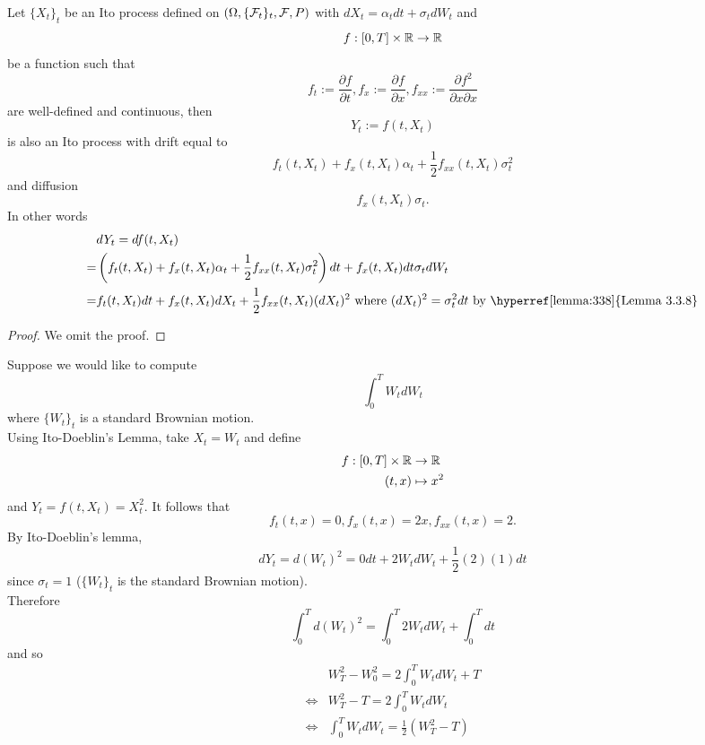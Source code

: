 \documentclass[11pt,fleqn]{book} %
\begin{document}
\begin{theorem} \label{thm:339}
Let \(\{X_t\}_t\) be an Ito process defined on \((\Omega, \{\mathcal{F}_t\}_t, \mathcal{F}, P)\) with \(dX_t = \alpha_tdt + \sigma_tdW_t\) and
\[
f:[0, T]\times\mathbb{R}\rightarrow\mathbb{R}
\]
be a function such that
\[
f_t := \frac{\partial f}{\partial t}, f_x := \frac{\partial f}{\partial x}, f_{xx} := \frac{\partial f^2}{\partial x\partial x}
\]
are well-defined and continuous, then
\[
Y_t := f(t, X_t)
\]
is also an Ito process with drift equal to
\[
f_t(t, X_t) + f_x(t, X_t)\alpha_t + \frac12 f_{xx}(t, X_t)\sigma_t^2
\]
and diffusion
\[
f_x(t, X_t)\sigma_t.
\]
\indent In other words
\[
\begin{aligned}
&dY_t = df(t, X_t) \\
= &\left(f_t(t, X_t) + f_x(t, X_t)\alpha_t + \frac12 f_{xx}(t, X_t)\sigma_t^2\right)dt + f_x(t, X_t)dt\sigma_tdW_t \\
= &f_t(t, X_t)dt + f_x(t, X_t)dX_t + \frac12 f_{xx}(t, X_t)(dX_t)^2 \text{ where } (dX_t)^2 = \sigma_t^2dt \text{ by \hyperref[lemma:338]{Lemma 3.3.8}}
\end{aligned}
\]
\end{theorem}
\begin{proof}
    We omit the proof.
\end{proof}

\begin{example} \label{eg:3310}
Suppose we would like to compute
\[
\int_0^T W_tdW_t
\]
where \(\{W_t\}_t\) is a standard Brownian motion. \\
\indent Using Ito-Doeblin's Lemma, take \(X_t = W_t\) and define
\[
\begin{aligned}
f:[0, T] \times \mathbb{R} &\rightarrow \mathbb{R} \\
(t, x) &\mapsto x^2
\end{aligned}
\]
and \(Y_t = f(t, X_t) = X_t^2\). It follows that
\[
f_t(t, x) = 0, f_x(t, x) = 2x, f_{xx}(t, x) = 2.
\]
\indent By Ito-Doeblin's lemma, 
\[
dY_t = d(W_t)^2 = 0dt + 2W_tdW_t + \frac12(2)(1)dt
\]
since \(\sigma_t = 1\) (\(\{W_t\}_t\) is the standard Brownian motion). \\
\indent Therefore
\[
\int_0^T d(W_t)^2 = \int_0^T 2W_tdW_t + \int_0^T dt
\]
and so
\[
\begin{aligned}
& W_T^2 - W_0^2 = 2\int_0^T W_tdW_t + T \\
\Leftrightarrow &W_T^2 - T = 2\int_0^T W_tdW_t \\
\Leftrightarrow &\int_0^T W_tdW_t = \frac12(W_T^2 - T)
\end{aligned}
\]
\end{example}
\end{document}
